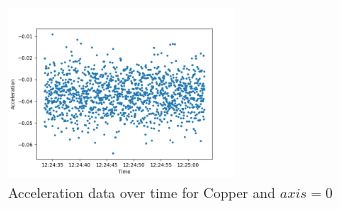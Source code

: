 \begin{figure}[h!]
    \centering
    \includegraphics[width=60mm]{Python/Lab6/Plots/rawdataCUa0.png}
    \caption{Acceleration data over time for Copper and $axis = 0$} 
    \label{fig:rawdata}
\end{figure}